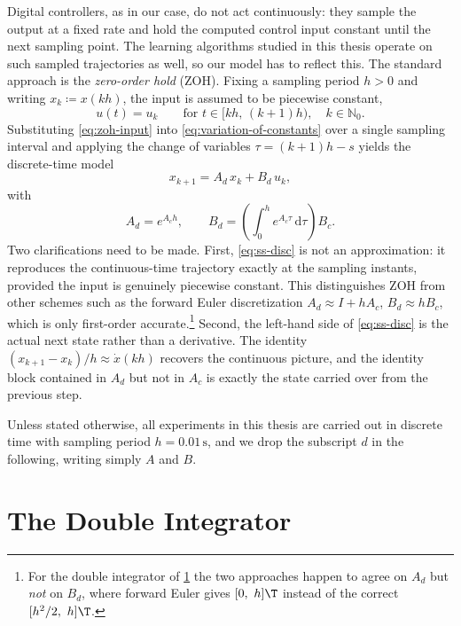 Digital controllers, as in our case, do not act continuously: they sample the output at a fixed
rate and hold the computed control input constant until the next sampling point. The
learning algorithms studied in this thesis operate on such sampled trajectories
as well, so our model has to reflect this. The standard approach is the
\emph{zero-order hold} (ZOH). Fixing a sampling period $h > 0$ and writing
$x_k \coloneqq x(kh)$, the input is assumed to be piecewise constant,
\begin{equation}
    \label{eq:zoh-input}
    u(t) = u_k \qquad \text{for } t \in [kh,\, (k+1)h), \quad k \in \mathbb{N}_0 .
\end{equation}
Substituting \eqref{eq:zoh-input} into \eqref{eq:variation-of-constants} over a
single sampling interval and applying the change of variables
$\tau = (k+1)h - s$ yields the discrete-time model
\begin{equation}
    \label{eq:ss-disc}
    x_{k+1} = A_d\, x_k + B_d\, u_k ,
\end{equation}
with
\begin{equation}
    \label{eq:zoh-matrices}
    A_d = e^{A_c h},
    \qquad
    B_d = \left( \int_{0}^{h} e^{A_c \tau} \, \mathrm{d}\tau \right) B_c .
\end{equation}
Two clarifications need to be made. First, \eqref{eq:ss-disc} is not an approximation: it
reproduces the continuous-time trajectory exactly at the sampling
instants, provided the input is genuinely piecewise constant. This distinguishes
ZOH from other schemes such as the forward Euler discretization
$A_d \approx I + h A_c$, $B_d \approx h B_c$, which is only first-order
accurate.\footnote{For the double integrator of
\cref{sec:double-integrator} the two approaches happen to agree on $A_d$ but
\emph{not} on $B_d$, where forward Euler gives $[0,\ h]\T$ instead of the
correct $[h^2/2,\ h]\T$.} Second, the left-hand side of \eqref{eq:ss-disc} is the actual next
state rather than a derivative. The identity
$(x_{k+1} - x_k)/h \approx \dot{x}(kh)$ recovers the continuous picture, and the
identity block contained in $A_d$ but not in $A_c$ is exactly the state carried
over from the previous step.
 
Unless stated otherwise, all experiments in this thesis are carried out in
discrete time with sampling period $h = 0.01\,\mathrm{s}$, and
we drop the subscript $d$ in the following, writing simply $A$ and $B$.
 
\section{The Double Integrator}
\label{sec:double-integrator}
 
